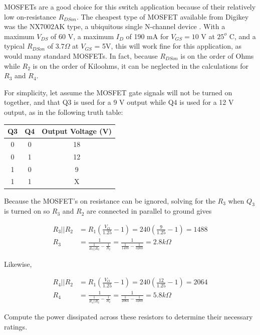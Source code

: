 \documentclass{article}
\begin{document}
		MOSFETs are a good choice for this switch application because of their relatively low on-resistance $R_{DSon}$.  The cheapest type of MOSFET available from Digikey was the NX7002AK type, a ubiquitous single N-channel device \cite{NX7002AKdatasheet}.  With a maximum $V_{DS}$ of 60 V, a maximum $I_D$ of 190 mA for $V_{GS} = 10$ V at $25^o$ C, and a typical $R_{DSon}$ of $3.7 \Omega$ at $V_{GS}$ = 5V, this will work fine for this application, as would many standard MOSFETs.  In fact, because $R_{DSon}$ is on the order of Ohms while $R_2$ is on the order of Kiloohms, it can be neglected in the calculations for $R_3$ and $R_4$.

		For simplicity, let assume the MOSFET gate signals will not be turned on together, and that Q3 is used for a 9 V output while Q4 is used for a 12 V output, as in the following truth table:

		\begin{center}
		\begin{tabular}{c c|c}
			Q3 & Q4 & Output Voltage (V) \\
			\hline
			0 & 0 & 18 \\
			0 & 1 & 12 \\
			1 & 0 & 9 \\
			1 & 1 & X
		\end{tabular}
		\end{center}

		Because the MOSFET's on resistance can be ignored, solving for the $R_3$ when $Q_3$ is turned on so $R_3$ and $R_2$ are connected in parallel to ground gives

		\begin{align}
			R_3 || R_2 &= R_1 \left( \frac{V_O}{1.25} - 1 \right) = 240 \left( \frac{9}{1.25} - 1 \right) = 1488 \\
			R_3 &= \frac{1}{\frac{1}{R_3 || R_2} - \frac{1}{R_2}} = \frac{1}{\frac{1}{1488} - \frac{1}{3200}} = 2.8 k\Omega
		\end{align}

		Likewise, 

		\begin{align}
			R_4 || R_2 &= R_1 \left( \frac{V_O}{1.25} - 1 \right) = 240 \left( \frac{12}{1.25} - 1 \right) = 2064 \\
			R_4 &= \frac{1}{\frac{1}{R_4 || R_2} - \frac{1}{R_2}} = \frac{1}{\frac{1}{2064} - \frac{1}{3200}} = 5.8 k\Omega
		\end{align}

		Compute the power dissipated across these resistors to determine their necessary ratings.
\end{document}
